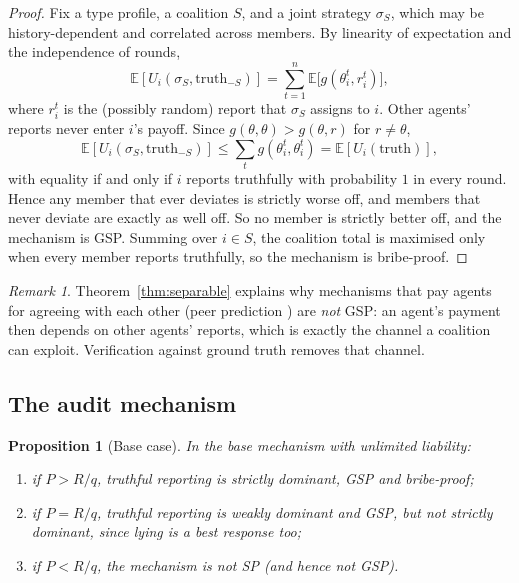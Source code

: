 \documentclass[11pt]{article}
\newtheorem{proposition}[theorem]{Proposition}
\theoremstyle{definition}
\theoremstyle{remark}
\newtheorem{remark}[theorem]{Remark}
\newcommand{\E}{\mathbb{E}}
\newcommand{\1}{\mathbf{1}}
\begin{document}
\begin{proof}
Fix a type profile, a coalition $S$, and a joint strategy $\sigma_S$, which may be
history-dependent and correlated across members. By linearity of expectation and the
independence of rounds,
\[
\E[U_i(\sigma_S,\text{truth}_{-S})] = \sum_{t=1}^n \E\big[g(\theta_i^t,r_i^t)\big],
\]
where $r_i^t$ is the (possibly random) report that $\sigma_S$ assigns to $i$. Other agents'
reports never enter $i$'s payoff. Since $g(\theta,\theta)>g(\theta,r)$ for $r\ne\theta$,
\[
\E[U_i(\sigma_S,\text{truth}_{-S})]\le \sum_t g(\theta_i^t,\theta_i^t)=\E[U_i(\text{truth})],
\]
with equality if and only if $i$ reports truthfully with probability $1$ in every round.
Hence any member that ever deviates is strictly worse off, and members that never deviate
are exactly as well off. So no member is strictly better off, and the mechanism is GSP.
Summing over $i\in S$, the coalition total is maximised only when every member reports
truthfully, so the mechanism is bribe-proof.
\end{proof}

\begin{remark}
Theorem~\ref{thm:separable} explains why mechanisms that pay agents for agreeing with
each other (peer prediction \cite{prelec2004,miller2005}) are \emph{not} GSP: an agent's
payment then depends on other agents' reports, which is exactly the channel a coalition
can exploit. Verification against ground truth removes that channel.
\end{remark}

\subsection{The audit mechanism}

\begin{proposition}[Base case]\label{prop:base}
In the base mechanism with unlimited liability:
\begin{enumerate}[label=(\alph*)]
    \item if $P>R/q$, truthful reporting is strictly dominant, GSP and bribe-proof;
    \item if $P=R/q$, truthful reporting is weakly dominant and GSP, but not strictly
    dominant, since lying is a best response too;
    \item if $P<R/q$, the mechanism is not SP (and hence not GSP).
\end{enumerate}
\end{proposition}
\end{document}
